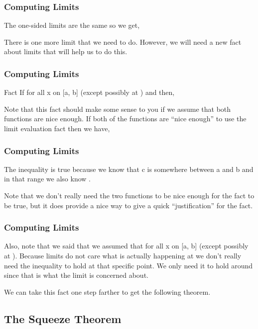\documentclass{beamer}
\begin{document}
\begin{frame}[fragile]
	\frametitle{Computing Limits}
	\Large
The one-sided limits are the same so we get,


There is one more limit that we need to do.  However, we will need a new fact about limits that will help us to do this.

\end{frame}
\begin{frame}[fragile]
	\frametitle{Computing Limits}
	\Large
Fact
If  for all x on [a, b] (except possibly at  ) and  then,


Note that this fact should make some sense to you if we assume that both functions are nice enough.  If both of the functions are “nice enough” to use the limit evaluation fact then we have,

\end{frame}
\begin{frame}[fragile]
	\frametitle{Computing Limits}
	\Large

The inequality is true because we know that c is somewhere between a and b and in that range we also know . 

Note that we don’t really need the two functions to be nice enough for the fact to be true, but it does provide a nice way to give a quick “justification” for the fact.
\end{frame}
\begin{frame}[fragile]
	\frametitle{Computing Limits}
	\Large
Also, note that we said that we assumed that  for all x on [a, b] (except possibly at  ).  Because limits do not care what is actually happening at  we don’t really need the inequality to hold at that specific point.  We only need it to hold around  since that is what the limit is concerned about.

We can take this fact one step farther to get the following theorem.
\end{frame}
\subsection*{The Squeeze Theorem}
\end{document}

